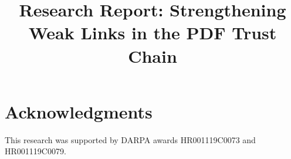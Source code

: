\documentclass[conference,10pt]{IEEEtran}
\begin{document}
\date{}

\title{Research Report: Strengthening Weak Links in the PDF Trust Chain}

\author{
     \and
}

\maketitle
\thispagestyle{plain} %



\begin{comment}
CONVENTION:
 - using this lstlisting[style=meta] environment to capture
   text in outline form that has not been fleshed out / turned into prose.

META NOTES:  
- aim for 12 pages (in 10pt) (LangSec specifies no limit)

TERMS (to actually use, and define when needed):
- ``complies with standard'', ``compatible with standard''
- Pre-DOM
- XRef (capitalized thus)
- Trust Chain (no quotes) [remove upper case?]
- parser differential
\end{comment}

















\section*{Acknowledgments}

This research was supported by DARPA awards HR001119C0073 and
HR001119C0079.





\appendix


\end{document}
